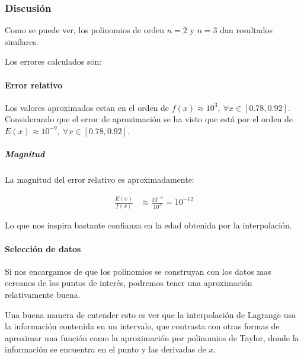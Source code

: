 \newpage

\subsubsection{Discusión}


Como se puede ver, los polinomios de orden $n = 2$ y $n = 3$ dan resultados similares. 

Los errores calculados son:

\begin{table}[htbp]
	\centering
\end{table}

\paragraph{Error relativo}
Los valores aproximados estan en el orden de $f(x) \approx 10^{3}, ~ \forall x \in [0.78, 0.92]$. Considerando que el error de aproximación se ha visto que está por el orden de $E(x) \approx 10^{-9}, ~ \forall x \in [0.78, 0.92]$.

\subparagraph{Magnitud}

La magnitud del error relativo es aproximadamente:

\begin{align*}
	\frac { E(x) } { f(x) } 
	&\approx \frac{10^{-9}}{10^3}
	= 10^{-12}
\end{align*}

Lo que nos inspira bastante confianza en la edad obtenida por la interpolación.

\paragraph{Selección de datos}
Si nos encargamos de que los polinomios se construyan con los datos mas cercanos de los puntos de interés, podremos tener una aproximación relativamente buena.


Una buena manera de entender esto es ver que la interpolación de Lagrange usa la información contenida en un intervalo, que contrasta con otras formas de aproximar una función como la aproximación por polinomios de Taylor, donde la información se encuentra en el punto y las derivadas de $x$.

